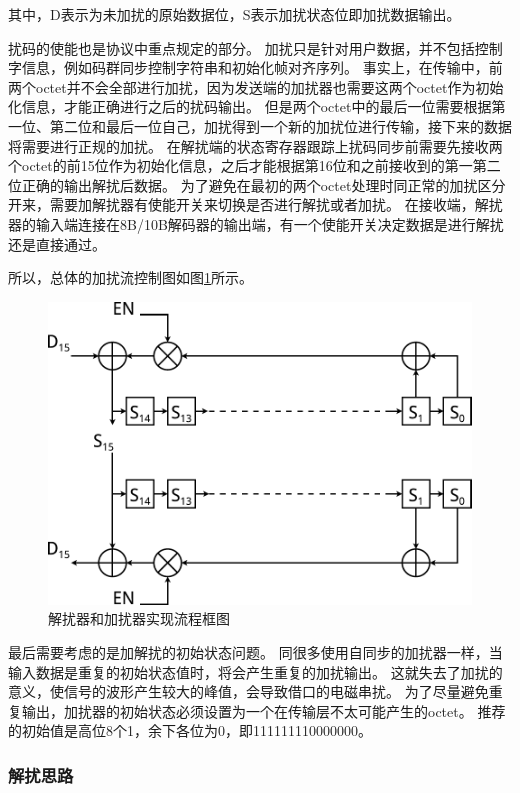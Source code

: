 \documentclass[UTF8]{ctexart}
\begin{document}
其中，D表示为未加扰的原始数据位，S表示加扰状态位即加扰数据输出。

扰码的使能也是协议中重点规定的部分。
加扰只是针对用户数据，并不包括控制字信息，例如码群同步控制字符串和初始化帧对齐序列。
事实上，在传输中，前两个octet并不会全部进行加扰，因为发送端的加扰器也需要这两个octet作为初始化信息，才能正确进行之后的扰码输出。
但是两个octet中的最后一位需要根据第一位、第二位和最后一位自己，加扰得到一个新的加扰位进行传输，接下来的数据将需要进行正规的加扰。
在解扰端的状态寄存器跟踪上扰码同步前需要先接收两个octet的前15位作为初始化信息，之后才能根据第16位和之前接收到的第一第二位正确的输出解扰后数据。
为了避免在最初的两个octet处理时同正常的加扰区分开来，需要加解扰器有使能开关来切换是否进行解扰或者加扰。
在接收端，解扰器的输入端连接在8B/10B解码器的输出端，有一个使能开关决定数据是进行解扰还是直接通过。

所以，总体的加扰流控制图如图\ref{fig:scrambler_descrambler_implementation}所示。

\begin{figure}[H]
\centering
\includegraphics[width=18cm]{./img/scrambler_descrambler_implementation.pdf}
\caption{解扰器和加扰器实现流程框图}
\label{fig:scrambler_descrambler_implementation}
\end{figure}

最后需要考虑的是加解扰的初始状态问题。
同很多使用自同步的加扰器一样，当输入数据是重复的初始状态值时，将会产生重复的加扰输出。
这就失去了加扰的意义，使信号的波形产生较大的峰值，会导致借口的电磁串扰。
为了尽量避免重复输出，加扰器的初始状态必须设置为一个在传输层不太可能产生的octet。
推荐的初始值是高位8个1，余下各位为0，即111111110000000。

\subsubsection{解扰思路}
\end{document}
